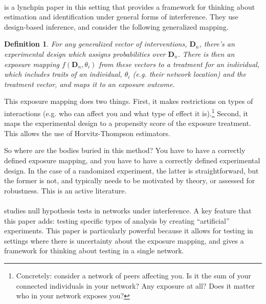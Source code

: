 \documentclass{tufte-handout}
\theoremstyle{break}
\newtheorem{defN}{Definition}
\begin{document}
\paragraph{\citet{aronow2017estimating}} is a lynchpin paper in this setting that provides a framework for thinking about estimation and identification under general forms of interference. They use design-based inference, and consider the following generalized mapping.

\begin{defN}
  For any generalized vector of interventions, $\mathbf{D}_{n}$, there's an experimental design which assigns probabilities over $\mathbf{D}_{n}$. There is then an \emph{exposure} mapping $f(\mathbf{D}_{n}, \theta_{i})$ from these vectors to a treatment for an individual, which includes traits of an individual, $\theta_{i}$ (e.g. their network location) and the treatment vector, and maps it to an exposure outcome.
\end{defN}

This exposure mapping does two things. First, it makes restrictions on types of interactions (e.g. who can affect you and what type of effect it is).\footnote{Concretely: consider a network of peers affecting you. Is it the sum of your connected individuals in your network? Any exposure at all? Does it matter who in your network exposes you?} Second, it maps the experimental design to a propensity score of the exposure treatment. This allows the use of Horvitz-Thompson estimators.

So where are the bodies buried in this method? You have to have a correctly defined exposure mapping, and you have to have a correctly defined experimental design. In the case of a randomized experiment, the latter is straightforward, but the former is not, and typically needs to be motivated by theory, or assessed for robustness. This is an active literature.

\paragraph{\citet{athey2018exact}} studies null hypothesis tests in networks under interference. A key feature that this paper adds: testing specific types of analysis by creating ``artificial'' experiments. This paper is particularly powerful because it allows for testing in settings where there is uncertainty about the exposure mapping, and gives a framework for thinking about testing in a single network. 
\end{document}
